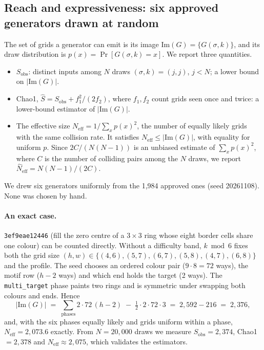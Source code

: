 \documentclass[11pt]{article}
\newcommand{\gen}[1]{\texttt{#1}}
\begin{document}
\subsection{Reach and expressiveness: six approved generators drawn at random}
\label{sec:reach}

The set of grids a generator can emit is its image
$\mathrm{Im}(G)=\{G(\sigma,k)\}$, and its draw distribution is $p(x)=\Pr[G(\sigma,k)=x]$.
We report three quantities.
\begin{itemize}[nosep]
  \item $S_{\mathrm{obs}}$: distinct inputs among $N$ draws $(\sigma,k)=(j,j)$, $j<N$; a lower bound on $|\mathrm{Im}(G)|$.
  \item Chao1, $\hat S = S_{\mathrm{obs}} + f_1^2/(2f_2)$, where $f_1,f_2$ count grids seen once and twice: a lower-bound estimator of $|\mathrm{Im}(G)|$.
  \item The effective size $N_{\mathrm{eff}} = 1/\sum_x p(x)^2$, the number of equally likely grids with the same collision rate. It satisfies $N_{\mathrm{eff}} \le |\mathrm{Im}(G)|$, with equality for uniform $p$. Since $2C/(N(N-1))$ is an unbiased estimate of $\sum_x p(x)^2$, where $C$ is the number of colliding pairs among the $N$ draws, we report $\hat N_{\mathrm{eff}} = N(N-1)/(2C)$.
\end{itemize}

We drew six generators uniformly from the 1,984 approved ones (seed 20261108).
None was chosen by hand.

\paragraph{An exact case.} \gen{3ef9eae12446} (fill the zero centre of a
$3\times3$ ring whose eight border cells share one colour) can be counted
directly. Without a difficulty band, $k \bmod 6$ fixes both the grid size $(h,w)
\in \{(4,6),(5,7),(6,7),(5,8),(4,7),(6,8)\}$ and the profile. The seed chooses
an ordered colour pair ($9\cdot8=72$ ways), the motif row ($h-2$ ways) and which
end holds the target (2 ways). The \texttt{multi\_target} phase paints two rings
and is symmetric under swapping both colours and ends. Hence
\[
  |\mathrm{Im}(G)| \;=\; \sum_{\text{phases}} 2\cdot72\,(h-2) \;-\; \tfrac12\cdot 2\cdot72\cdot3 \;=\; 2{,}592 - 216 \;=\; 2{,}376,
\]
and, with the six phases equally likely and grids uniform within a phase,
$N_{\mathrm{eff}} = 2{,}073.6$ exactly. From $N=20{,}000$ draws we measure
$S_{\mathrm{obs}}=2{,}374$, Chao1 $=2{,}378$ and $N_{\mathrm{eff}}\approx2{,}075$,
which validates the estimators.
\end{document}
